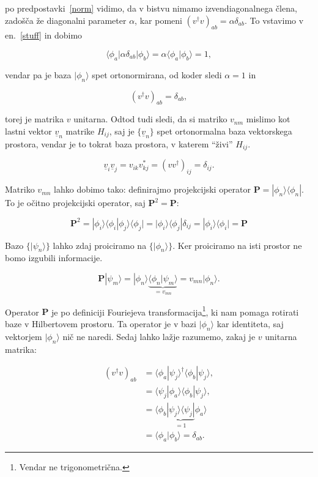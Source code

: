 \documentclass[a4 paper, 12pt]{article}
\begin{document}
po predpostavki~\eqref{norm} vidimo, da v bistvu nimamo izvendiagonalnega člena, zadošča že
diagonalni parameter $\alpha$, kar pomeni $(v^\dagger v)_{ab} = \alpha \delta_{ab}$. To
vstavimo v en.~\eqref{stuff} in dobimo

\begin{equation*}
	\langle\phi_a|\alpha\delta_{ab}|\phi_b\rangle = \alpha\langle\phi_a|\phi_b\rangle = 1,
\end{equation*}

vendar pa je baza ${|\phi_n\rangle}$ spet ortonormirana, od koder sledi $\alpha = 1$ in

\begin{equation}
	(v^\dagger v)_{ab} = \delta_{ab},
\end{equation}

torej je matrika $v$ unitarna. Odtod tudi sledi, da si matriko $v_{nm}$ mislimo kot lastni
vektor $\underline{v}_n$ matrike $H_{ij}$, saj je $\{\underline{v}_n\}$ spet
ortonormalna baza vektorskega prostora, vendar je to tokrat baza prostora, v katerem "`živi"'
$H_{ij}$. 

\[
	\underline{v}_i\underline{v}_j = v_{ik} v_{kj}^* = (vv^\dagger)_{ij} = \delta_{ij}.
\]

Matriko $v_{mn}$ lahko dobimo tako: definirajmo projekcijski operator
$\mathbf{P} = |\phi_n\rangle\langle\phi_n|$. To je očitno projekcijski operator, saj
$\mathbf{P}^2 = \mathbf{P}$:

\[
	\mathbf{P}^2 = |\phi_i\rangle\langle\phi_i|\phi_j\rangle\langle\phi_j| =
		|\phi_i\rangle\langle\phi_j|\delta_{ij} = |\phi_i\rangle\langle\phi_i| = 
		\mathbf{P}
\]

Bazo $\big\{|\psi_n\rangle\big\}$ lahko zdaj proiciramo na $\big\{|\phi_n\rangle\big\}$.
Ker proiciramo na isti prostor ne bomo izgubili informacije.

\[
	\mathbf{P}|\psi_m\rangle = |\phi_n\rangle\underbrace{\langle\phi_n|\psi_m\rangle}_{=
		v_{mn}} = v_{mn}|\phi_n\rangle.
\]

Operator $\mathbf{P}$ je po definiciji Fouriejeva transformacija\footnote{Vendar ne
trigonometrična.}, ki nam pomaga rotirati baze v Hilbertovem prostoru. Ta operator je v bazi
$|\phi_n\rangle$ kar identiteta, saj vektorjem $|\phi_n\rangle$ nič ne naredi. Sedaj lahko
lažje razumemo, zakaj je $v$ unitarna matrika:

\begin{align*}
	(v^\dagger v)_{ab} &= \langle\phi_a|\psi_j\rangle^\dagger \langle\phi_b|\psi_j\rangle, \\
	&= \langle\psi_j|\phi_a\rangle \langle\phi_b|\psi_j\rangle, \\
	&= \langle\phi_b\underbrace{|\psi_j\rangle\langle\psi_j|}_{= 1}\phi_a\rangle \\
	&= \langle\phi_a|\phi_b\rangle = \delta_{ab}.
\end{align*}
\end{document}
